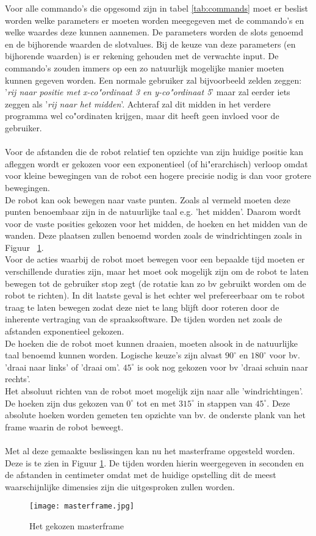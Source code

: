 Voor alle commando's die opgesomd zijn in tabel \ref{tab:commands} moet er beslist worden welke parameters er moeten worden meegegeven met de commando's en welke waardes deze kunnen aannemen. De parameters worden de slots genoemd en de bijhorende waarden de slotvalues. Bij de keuze van deze parameters (en bijhorende waarden) is er rekening gehouden met de verwachte input. De commando's zouden immers op een zo natuurlijk mogelijke manier moeten kunnen gegeven worden. Een normale gebruiker zal bijvoorbeeld zelden zeggen: '\textit{rij naar positie met x-co"ordinaat 3 en y-co"ordinaat 5}' maar zal eerder iets zeggen als '\textit{rij naar het midden}'. Achteraf zal dit midden in het verdere programma wel co"ordinaten krijgen, maar dit heeft geen invloed voor de gebruiker.\\
\\
Voor de afstanden die de robot relatief ten opzichte van zijn huidige positie kan afleggen wordt er gekozen voor een exponentieel (of hi"erarchisch) verloop omdat voor kleine bewegingen van de robot een hogere precisie nodig is dan voor grotere bewegingen.\\
De robot kan ook bewegen naar vaste punten. Zoals al vermeld moeten deze punten benoembaar zijn in de natuurlijke taal e.g. 'het midden'. Daarom wordt voor de vaste posities gekozen voor het midden, de hoeken en het midden van de wanden. Deze plaatsen zullen benoemd worden zoals de windrichtingen zoals in Figuur ~\ref{fig:masterframe}.\\
Voor de acties waarbij de robot moet bewegen voor een bepaalde tijd moeten er verschillende duraties zijn, maar het moet ook mogelijk zijn om de robot te laten bewegen tot de gebruiker stop zegt (de rotatie kan zo bv gebruikt worden om de robot te richten). In dit laatste geval is het echter wel prefereerbaar om te robot traag te laten bewegen zodat deze niet te lang blijft door roteren door de inherente vertraging van de spraaksoftware. De tijden worden net zoals de afstanden exponentieel gekozen.\\
De hoeken die de robot moet kunnen draaien, moeten alsook in de natuurlijke taal benoemd kunnen worden. Logische keuze's zijn alvast $90^\circ$ en $180^\circ$ voor bv. 'draai naar links' of 'draai om'. $45^\circ$ is ook nog gekozen voor bv 'draai schuin naar rechts'.\\
Het absoluut richten van de robot moet mogelijk zijn naar alle 'windrichtingen'. De hoeken zijn dus gekozen van $0^\circ$ tot en met $315^\circ$ in stappen van $45^\circ$. Deze absolute hoeken worden gemeten ten opzichte van bv. de onderste plank van het frame waarin de robot beweegt.\\
\\
Met al deze gemaakte beslissingen kan nu het masterframe opgesteld worden. Deze is te zien in Figuur \ref{fig:masterframe}. De tijden worden hierin weergegeven in seconden en de afstanden in centimeter omdat met de huidige opstelling dit de meest waarschijnlijke dimensies zijn die uitgesproken zullen worden.

\begin{figure}[h]
\texttt{[image: masterframe.jpg]}
\label{fig:masterframe}
\centering
\caption{Het gekozen masterframe}
\end{figure}
